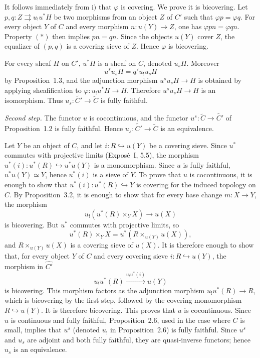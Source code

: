 \documentclass[11pt]{article}
\begin{document}
It follows immediately from \(\mathrm{i})\) that \(\varphi\) is covering. We prove it is bicovering. Let \(p,q:Z\rightrightarrows u_!u^*H\) be two morphisms from an object \(Z\) of \(C'\) such that \(\varphi p=\varphi q\). For every object \(Y\) of \(C\) and every morphism \(n:u(Y)\to Z\), one has \(\varphi pn=\varphi qn\). Property \((*)\) then implies \(pn=qn\). Since the objects \(u(Y)\) cover \(Z\), the equalizer of \((p,q)\) is a covering sieve of \(Z\). Hence \(\varphi\) is bicovering.

For every sheaf \(H\) on \(C'\), \(u^*H\) is a sheaf on \(C\), denoted \(u_sH\). Moreover
\[
u^su_sH=\underline a'u_!u_sH
\]
by Proposition~1.3, and the adjunction morphism \(u^su_sH\to H\) is obtained by applying sheafification to \(\varphi:u_!u^*H\to H\). Therefore \(u^su_sH\to H\) is an isomorphism. Thus \(u_s:\widetilde{C'}\to\widetilde C\) is fully faithful.

\medskip
\noindent\emph{Second step.} The functor \(u\) is cocontinuous, and the functor \(u^s:\widetilde C\to\widetilde{C'}\) of Proposition~1.2 is fully faithful. Hence \(u_s:\widetilde{C'}\to\widetilde C\) is an equivalence.

Let \(Y\) be an object of \(C\), and let \(i:R\hookrightarrow u(Y)\) be a covering sieve. Since \(u^*\) commutes with projective limits (Expos\'e~I, 5.5), the morphism \(u^*(i):u^*(R)\hookrightarrow u^*u(Y)\) is a monomorphism. Since \(u\) is fully faithful, \(u^*u(Y)\simeq Y\), hence \(u^*(i)\) is a sieve of \(Y\). To prove that \(u\) is cocontinuous, it is enough to show that \(u^*(i):u^*(R)\hookrightarrow Y\) is covering for the induced topology on \(C\). By Proposition~3.2, it is enough to show that for every base change \(m:X\to Y\), the morphism
\[
u_!(u^*(R)\times_YX)\longrightarrow u(X)
\]
is bicovering. But \(u^*\) commutes with projective limits, so
\[
u^*(R)\times_YX=u^*(R\times_{u(Y)}u(X)),
\]
and \(R\times_{u(Y)}u(X)\) is a covering sieve of \(u(X)\). It is therefore enough to show that, for every object \(Y\) of \(C\) and every covering sieve \(i:R\hookrightarrow u(Y)\), the morphism in \(\widehat{C'}\)
\[
u_!u^*(R)\xrightarrow{u_!u^*(i)}u(Y)
\]
is bicovering. This morphism factors as the adjunction morphism \(u_!u^*(R)\to R\), which is bicovering by the first step, followed by the covering monomorphism \(R\hookrightarrow u(Y)\). It is therefore bicovering. This proves that \(u\) is cocontinuous. Since \(u\) is continuous and fully faithful, Proposition~2.6, used in the case where \(C\) is small, implies that \(u^s\) (denoted \(u_!\) in Proposition~2.6) is fully faithful. Since \(u^s\) and \(u_s\) are adjoint and both fully faithful, they are quasi-inverse functors; hence \(u_s\) is an equivalence.
\end{document}
